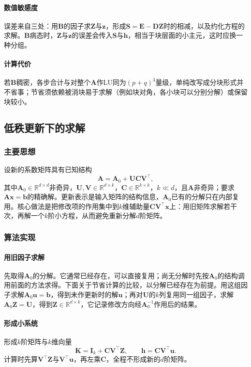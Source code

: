 \paragraph{数值敏感度}
误差来自三处：用$\bm B$的因子求$\bm Z$与$\bm z$，形成$\bm S=\bm E-\bm D\bm Z$时的相减，以及约化方程的求解。$\bm B$病态时，$\bm Z$与$\bm z$的误差会传入$\bm S$与$\bm h$，相当于块层面的小主元，这时应换一种分组。

\paragraph{计算代价}
若$\bm B$稠密，各步合计与对整个$\bm A$作LU同为$(p+q)^3$量级，单纯改写成分块形式并不省事；节省须依赖被消块易于求解（例如块对角，各小块可以分别分解）或保留块较小。

\subsection{低秩更新下的求解}
\label{sec:ls-woodbury}

\subsubsection{主要思想}
设新的系数矩阵具有已知结构
\[
 \bm A=\bm A_0+\bm U\bm C\bm V^\top,
\]
其中$\bm A_0\in\mathbb R^{d\times d}$非奇异，$\bm U,\bm V\in\mathbb R^{d\times k}$，$\bm C\in\mathbb R^{k\times k}$，$k\ll d$，且$\bm A$非奇异；要求$\bm A\bm x=\bm b$的精确解。更新表示是输入矩阵的结构信息，$\bm A_0$已有的分解只在内部复用。核心做法是把修改项的作用集中到$k$维辅助量$\bm C\bm V^\top\bm x$上：用旧矩阵求解若干次，再解一个$k$阶小方程，从而避免重新分解$d$阶矩阵。

\subsubsection{算法实现}
\paragraph{用旧因子求解}
先取得$\bm A_0$的分解。它通常已经存在，可以直接复用；尚无分解时先按$\bm A_0$的结构调用前面的方法求得。下面关于节省计算的比较，以分解已经存在为前提。用这组因子求解$\bm A_0\bm u=\bm b$，得到未作更新时的解$\bm u$；再对$\bm U$的$k$列复用同一组因子，求解$\bm A_0\bm Z=\bm U$，得到$\bm Z\in\mathbb R^{d\times k}$，它记录修改方向经$\bm A_0^{-1}$作用后的结果。

\paragraph{形成小系统}
形成$k$阶矩阵与$k$维向量
\[
 \bm K=\bm I_k+\bm C\bm V^\top\bm Z,\qquad
 \bm h=\bm C\bm V^\top\bm u .
\]
计算时先算$\bm V^\top\bm Z$与$\bm V^\top\bm u$，再左乘$\bm C$，全程不形成新的$d$阶矩阵。

